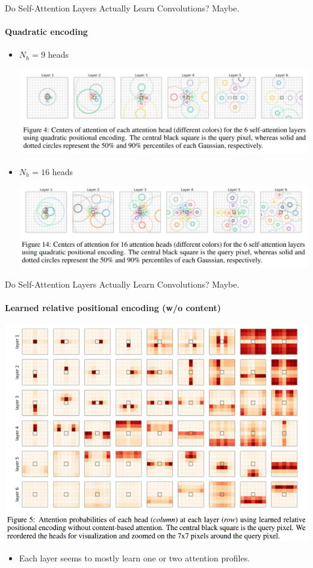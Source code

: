 \documentclass[9pt]{beamer}
\begin{document}
\begin{frame}{Do Self-Attention Layers Actually Learn Convolutions? Maybe.}
\framesubtitle{Quadratic encoding}
\begin{itemize}
\item $N_h=9$ heads
\begin{center}
    \includegraphics[width=.75\textwidth]{presentation/images/quad_emb_9.png}
\end{center}

\item $N_h=16$ heads
\begin{center}
    \includegraphics[width=.75\textwidth]{presentation/images/quad_emb_16.png}
\end{center}

\end{itemize}
\end{frame}


\begin{frame}{Do Self-Attention Layers Actually Learn Convolutions? Maybe.}
\framesubtitle{Learned relative positional encoding (w/o content)}
\begin{center}
    \includegraphics[width=.7\textwidth]{
        presentation/images/learned_rel_emb_nocontent.png}
    \vspace{-.1in}
\end{center}
\begin{itemize}
\item Each layer seems to mostly learn one or two attention profiles. 
\end{itemize}
\end{frame}
\end{document}
